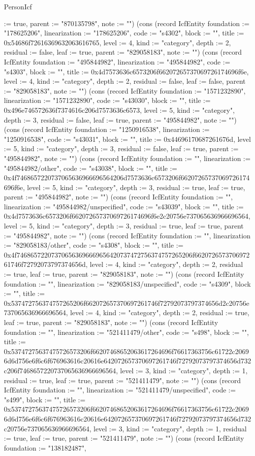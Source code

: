 \begin{lexlean}{PersonIcf}
\begin{semanticmodule}
{:= true, parent := "870135798", note := ""}) (cons (record IcfEntity {foundation := "178625206", linearization := "178625206", code := "s4302", block := "", title := 0x54686f72616369632063616765, level := 4, kind := "category", depth := 2, residual := false, leaf := true, parent := "829058183", note := ""}) (cons (record IcfEntity {foundation := "495844982", linearization := "495844982", code := "s4303", block := "", title := 0x4d7573636c6573206f66207265737069726174696f6e, level := 4, kind := "category", depth := 2, residual := false, leaf := false, parent := "829058183", note := ""}) (cons (record IcfEntity {foundation := "1571232890", linearization := "1571232890", code := "s43030", block := "", title := 0x496e746572636f7374616c206d7573636c6573, level := 5, kind := "category", depth := 3, residual := false, leaf := true, parent := "495844982", note := ""}) (cons (record IcfEntity {foundation := "1250916538", linearization := "1250916538", code := "s43031", block := "", title := 0x44696170687261676d, level := 5, kind := "category", depth := 3, residual := false, leaf := true, parent := "495844982", note := ""}) (cons (record IcfEntity {foundation := "", linearization := "495844982/other", code := "s43038", block := "", title := 0x4f7468657220737065636966696564206d7573636c6573206f66207265737069726174696f6e, level := 5, kind := "category", depth := 3, residual := true, leaf := true, parent := "495844982", note := ""}) (cons (record IcfEntity {foundation := "", linearization := "495844982/unspecified", code := "s43039", block := "", title := 0x4d7573636c6573206f66207265737069726174696f6e2c20756e737065636966696564, level := 5, kind := "category", depth := 3, residual := true, leaf := true, parent := "495844982", note := ""}) (cons (record IcfEntity {foundation := "", linearization := "829058183/other", code := "s4308", block := "", title := 0x4f746865722073706563696669656420737472756374757265206f662072657370697261746f72792073797374656d, level := 4, kind := "category", depth := 2, residual := true, leaf := true, parent := "829058183", note := ""}) (cons (record IcfEntity {foundation := "", linearization := "829058183/unspecified", code := "s4309", block := "", title := 0x537472756374757265206f662072657370697261746f72792073797374656d2c20756e737065636966696564, level := 4, kind := "category", depth := 2, residual := true, leaf := true, parent := "829058183", note := ""}) (cons (record IcfEntity {foundation := "", linearization := "521411479/other", code := "s498", block := "", title := 0x53747275637475726573206f66207468652063617264696f76617363756c61722c20696d6d756e6f6c6f676963616c20616e642072657370697261746f72792073797374656d732c206f7468657220737065636966696564, level := 3, kind := "category", depth := 1, residual := true, leaf := true, parent := "521411479", note := ""}) (cons (record IcfEntity {foundation := "", linearization := "521411479/unspecified", code := "s499", block := "", title := 0x53747275637475726573206f66207468652063617264696f76617363756c61722c20696d6d756e6f6c6f676963616c20616e642072657370697261746f72792073797374656d732c20756e737065636966696564, level := 3, kind := "category", depth := 1, residual := true, leaf := true, parent := "521411479", note := ""}) (cons (record IcfEntity {foundation := "138182487", }
\end{semanticmodule}
\end{lexlean}
